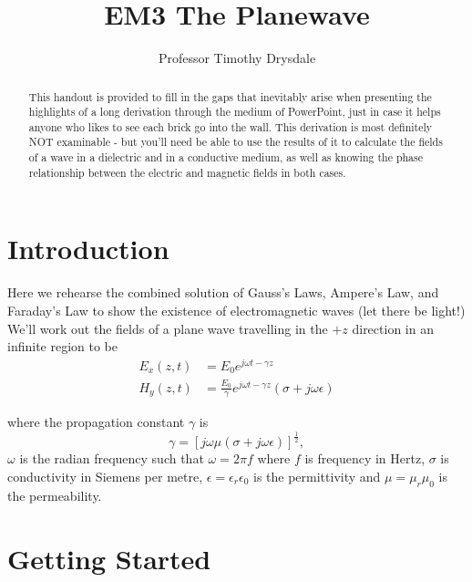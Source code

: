 \documentclass{tufte-handout}
\title{EM3 The Planewave}
\author{Professor Timothy Drysdale}
\begin{document}
\maketitle

\begin{abstract}
\noindent
This handout is provided to fill in the gaps that inevitably arise when presenting the highlights of a long derivation through the medium of PowerPoint, just in case it helps anyone who likes to see each brick go into the wall. This derivation is most definitely NOT examinable - but you'll need be able to use the results of it to calculate the fields of a wave in a dielectric and in a conductive medium, as well as knowing the phase relationship between the electric and magnetic fields in both cases.
\begin{marginfigure}

\end{marginfigure}
\end{abstract}

\section{Introduction}
Here we rehearse the combined solution of Gauss's Laws, Ampere's Law, and Faraday's Law to show the existence of electromagnetic waves (let there be light!) We'll work out the fields of a plane wave travelling in the $+z$ direction in an infinite region to be
\begin{align*}
E_x(z,t) &= E_0e^{j\omega{}t - \gamma{}z}\\
H_y(z,t) &= \frac{E_0}{\gamma}e^{j\omega{}t - \gamma{}z}\left(\sigma + j\omega\epsilon\right)
\end{align*}
\begin{marginfigure}

\end{marginfigure}
where the propagation constant $\gamma$ is 
\[ \gamma = \left[j\omega\mu\left(\sigma+j\omega\epsilon \right)\right]^{\frac{1}{2}},\]
$\omega$ is the radian frequency such that $\omega=2\pi{}f$ where $f$ is frequency in Hertz, $\sigma$ is conductivity in Siemens per metre, $\epsilon = \epsilon_r\epsilon_0$ is the permittivity and $\mu=\mu_r\mu_0$ is the permeability. 

\section{Getting Started}
\end{document}
